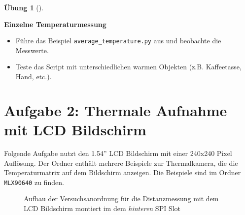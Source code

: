 \documentclass[
  11pt,
  a4paperpaper,
  oneside, openany  ,captions=tableheading
]{scrbook}
\providecommand{\tightlist}{%
  \setlength{\itemsep}{0pt}\setlength{\parskip}{0pt}}
\theoremstyle{definition}
\newtheorem{exercise}{Übung}[chapter]
\theoremstyle{remark}
\begin{document}
\begin{exercise}[]\protect\hypertarget{exr-thermalkamera}{}\label{exr-thermalkamera}

\textbf{Einzelne Temperaturmessung}

\begin{itemize}
\tightlist
\item
  Führe das Beispiel \texttt{average\_temperature.py} aus und beobachte
  die Messwerte.
\item
  Teste das Script mit unterschiedlichen warmen Objekten (z.B.
  Kaffeetasse, Hand, etc.).
\end{itemize}

\end{exercise}

\section{Aufgabe 2: Thermale Aufnahme mit LCD
Bildschirm}\label{aufgabe-2-thermale-aufnahme-mit-lcd-bildschirm}

Folgende Aufgabe nutzt den 1.54'' LCD Bildschirm mit einer 240x240 Pixel
Auflösung. Der Ordner enthält mehrere Beispiele zur Thermalkamera, die
die Temperaturmatrix auf dem Bildschirm anzeigen. Die Beispiele sind im
Ordner \texttt{MLX90640} zu finden.

\begin{figure}


\caption{\label{fig-mlx90640-LCD}Aufbau der Versuchsanordnung für die
Distanzmessung mit dem LCD Bildschirm montiert im dem \emph{hinteren}
SPI Slot}

\end{figure}%
\end{document}
